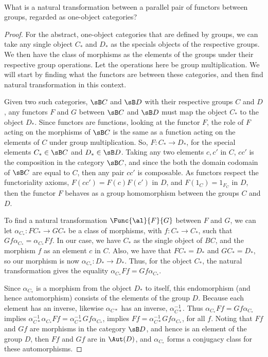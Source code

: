 \documentclass[../../main]{subfiles}
\begin{document}
\paragraph{}
\begin{exercise}
	What is a natural transformation between a parallel pair of functors between
	groups, regarded as one-object categories?
\end{exercise}

\begin{proof}
	For the abstract, one-object categories that are defined by groups, we can
	take any single object $C_*$ and $D_*$ as the specials objects of the
	respective groups. We then have the class of morphisms as the elements of
	the groups under their respective group operations. Let the operations here
	be group multiplication. We will start by finding what the functors are
	between these categories, and then find natural transformation in this
	context.

	Given two such categories, $\sB C$ and $\sB D$ with their respective groups $C$
	and $D$, any functors $F$ and $G$ between $\sB C$ and $\sB D$ must map the object
	$C_*$ to the object $D_*$. Since functors are functions, looking at the
	functor $F$, the role of $F$ acting on the morphisms of $\sB C$ is the same as
	a function acting on the elements of $C$ under group multiplication. So, $F:
	C_* \rightarrow D_*$, for the special elements $C_* \in \sB C$ and $D_* \in \sB D$.
	Taking any two elements $c, c'$ in $C$, $cc'$ is the composition in the
	category $\sB C$, and since the both the domain codomain of $\sB C$ are equal to $ C $, then any pair
	$cc'$ is composable. As functors respect the functoriality axioms, $F(cc') =
	F(c)F(c')$ in $D$, and $F(1_C) = 1_{F_C}$ in $D$, then the functor $F$
	behaves as a group homomorphism between the groups $C$ and $D$.

	To find a natural transformation $\Func{\al}{F}{G}$ between $F$ and $G$,
	we can let $\alpha_{C_*}\colon FC_* \rightarrow GC_*$ be a class of morphisms,
	with $f\colon C_* \rightarrow C_*$, such that $Gf\alpha_{C_*} = \alpha_{C_*}Ff$.
	In our case, we have $C_*$ as the single object of $BC$, and the morphism
	$f$ as an element $c$ in $C$. Also, we have that $FC_* = D_*$ and $GC_* =
	D_*$, so our morphism is now $\alpha_{C_*}\colon D_* \rightarrow D_*$.
	Thus, for the object $C_*$, the natural transformation gives the equality
	$\alpha_{C_*}Ff = Gf \alpha_{C_*}$.

	Since $\alpha_{C_*}$ is a morphism from the object $D_*$ to itself, this
	endomorphism (and hence automorphism) consists of the elements of the group
	$D$. Because each element has an inverse, likewise $\alpha_{C*}$ has an
	inverse, $\alpha_{C*}^{-1}$. Thus $\alpha_{C_*}Ff = Gf \alpha_{C_*}$ implies
	$\alpha_{C*}^{-1} \alpha_{C_*}Ff = \alpha_{C*}^{-1} Gf \alpha_{C_*}$,
	implies $Ff = \alpha_{C*}^{-1} Gf \alpha_{C_*}$, for all $f$. Noting that
	$Ff$ and $Gf$ are morphisms in the category $\sB D$, and hence is an element of
	the group $D$, then $Ff$ and $Gf$ are in $\Aut(D)$, and $\alpha_{C_*}$ forms
	a conjugacy class for these automorphisms.
\end{proof}
\end{document}
